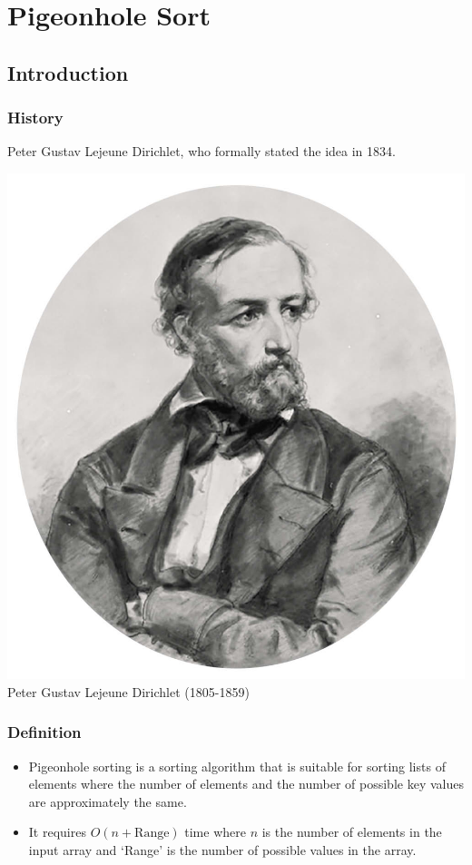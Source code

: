 \section{Pigeonhole Sort}

\subsection{Introduction}

\subsubsection{History}
Peter Gustav Lejeune Dirichlet, who formally stated the idea in 1834.

\begin{center}
\includegraphics[scale =0.15]{img/pglDirichlet.jpg} \\
Peter Gustav Lejeune Dirichlet (1805-1859)
\end{center}

\subsubsection{Definition}
\begin{itemize}
    \item Pigeonhole sorting is a sorting algorithm that is suitable for sorting lists of elements where the number of elements and the number of possible key values are approximately the same.
    \item It requires $O(n + \text{Range})$ time where $n$ is the number of elements in the input array and ‘Range’ is the number of possible values in the array.
\end{itemize}

